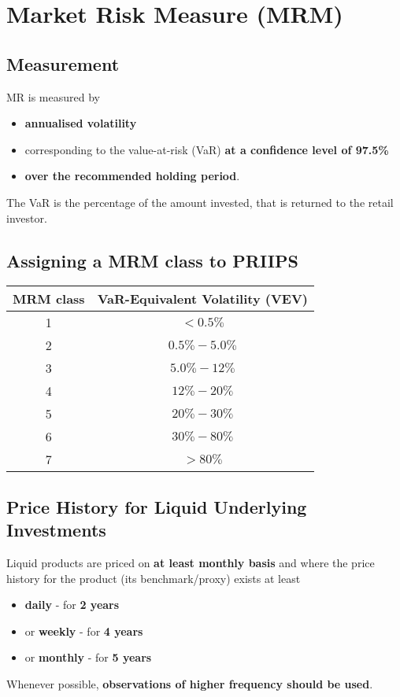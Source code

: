 \chapter{Market Risk Measure (MRM)}

\section{Measurement}
MR is measured by
\begin{itemize}
	\item \textbf{\color{blue}annualised volatility}
	\item corresponding to the value-at-risk (VaR) \textbf{\color{blue}at a confidence level of 97.5\%}
	\item \textbf{\color{blue}over the recommended holding period}.
\end{itemize}
The VaR is the percentage of the amount invested, that is returned to the retail investor.

\section{Assigning a MRM class to PRIIPS}

\begin{center}
	\begin{longtable}{| c | c |}
		\hline
		\textbf{MRM class} & \textbf{VaR-Equivalent Volatility (VEV)}\\
		\hline
		1 & $< 0.5\%$\\
		\hline
		2 & $0.5\% - 5.0\%$\\
		\hline
		3 & $5.0\% - 12\%$\\
		\hline
		4 & $12\% - 20\%$\\
		\hline
		5 & $20\% - 30\%$\\
		\hline
		6 & $30\% - 80\%$\\
		\hline
		7 & $> 80\%$\\
		\hline
	\end{longtable}
\end{center}

\section{Price History for Liquid Underlying Investments}
\label{Sec:LiquidUnderlyings}
Liquid products are priced on \textbf{\color{blue}at least monthly basis} and where the price history for the product (its benchmark/proxy) exists at least
\begin{itemize}
	\item \textbf{\color{blue}daily} - for \textbf{\color{Mahogany}2 years}
	\item or \textbf{\color{blue}weekly} - for \textbf{\color{Mahogany}4 years}
	\item or \textbf{\color{blue}monthly} - for \textbf{\color{Mahogany}5 years}
\end{itemize}
Whenever possible, \textbf{\color{Brown}observations of higher frequency should be used}.

